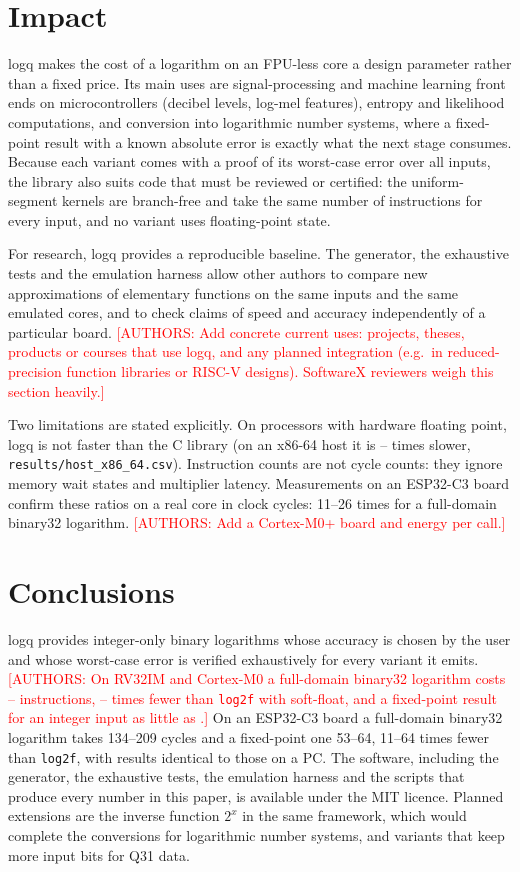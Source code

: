 \documentclass[preprint,12pt]{elsarticle}
\newcommand{\authors}[1]{\textcolor{red}{[AUTHORS: #1]}}
\begin{document}
\section{Impact}

logq makes the cost of a logarithm on an FPU-less core a design parameter
rather than a fixed price. Its main uses are signal-processing and machine
learning front ends on microcontrollers (decibel levels, log-mel features),
entropy and likelihood computations, and conversion into logarithmic number
systems, where a fixed-point result with a known absolute error is exactly
what the next stage consumes. Because each variant comes with a proof of its
worst-case error over all inputs, the library also suits code that must be
reviewed or certified: the uniform-segment kernels are branch-free and take
the same number of instructions for every input, and no variant uses
floating-point state.

For research, logq provides a reproducible baseline. The generator, the
exhaustive tests and the emulation harness allow other authors to compare
new approximations of elementary functions on the same inputs and the same
emulated cores, and to check claims of speed and accuracy independently of a
particular board. \authors{Add concrete current uses: projects, theses,
products or courses that use logq, and any planned integration (e.g.\ in
reduced-precision function libraries or RISC-V designs). SoftwareX reviewers
weigh this section heavily.}

Two limitations are stated explicitly. On processors with hardware floating
point, logq is not faster than the C library (on an x86-64 host it is
\numhostmin--\numhostmax{} times slower, \texttt{results/host\_x86\_64.csv}). Instruction counts
are not cycle counts: they ignore memory wait states and multiplier latency.
Measurements on an ESP32-C3 board confirm these ratios on a real core in
clock cycles: 11--26 times for a full-domain binary32 logarithm. \authors{Add a Cortex-M0+ board and energy per call.}

\section{Conclusions}

logq provides integer-only binary logarithms whose accuracy is chosen by the
user and whose worst-case error is verified exhaustively for every variant it
emits. \authors{On RV32IM and Cortex-M0 a full-domain binary32 logarithm costs
\numinsmin--\numinsmax{} instructions, \numratmin--\numratmax{} times fewer than \texttt{log2f} with
soft-float, and a fixed-point result for an integer input as little as \numintrv.} On an
ESP32-C3 board a full-domain binary32 logarithm takes 134--209 cycles and a
fixed-point one 53--64, 11--64 times fewer than \texttt{log2f}, with results
identical to those on a PC. The software,
including the generator, the exhaustive tests, the emulation harness and the
scripts that produce every number in this paper, is available under the MIT
licence. Planned extensions are the inverse function $2^x$ in the same
framework, which would complete the conversions for logarithmic number
systems, and variants that keep more input bits for Q31 data.
\end{document}
